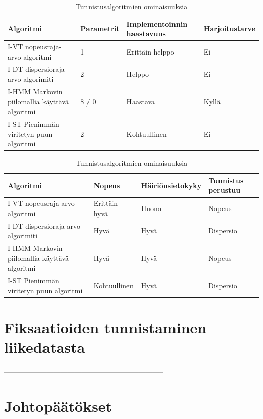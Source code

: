 		\begin{table}
    \begin{tabular}{| p{4cm} | p{3cm} | p{3cm}| p{3.5cm} |}
    \hline
    Algoritmi & Parametrit & Implementoinnin haastavuus & Harjoitustarve \\ \hline
    I-VT nopeusraja-arvo algoritmi & 1 & Erittäin helppo & Ei\\ \hline
    I-DT dispersioraja-arvo algorimiti & 2 & Helppo & Ei \\ \hline
    I-HMM Markovin piilomallia käyttävä algoritmi & 8 / 0 & Haastava & Kyllä \\ \hline
		I-ST Pienimmän viritetyn puun algoritmi & 2 & Kohtuullinen & Ei \\
    \hline
    \end{tabular}
		
		\vspace*{0.2 cm}
		
    \begin{tabular}{| p{4cm} | p{3cm} | p{3cm} |  p{3.5cm} |}
    \hline
    Algoritmi & Nopeus & Häiriönsietokyky & Tunnistus perustuu  \\ \hline
    I-VT nopeusraja-arvo algoritmi  & Erittäin hyvä & Huono  & Nopeus \\ \hline
    I-DT dispersioraja-arvo algorimiti  & Hyvä & Hyvä & Dispersio\\ \hline
    I-HMM Markovin piilomallia käyttävä algoritmi & Hyvä & Hyvä & Nopeus \\ \hline
		I-ST Pienimmän viritetyn puun algoritmi & Kohtuullinen & Hyvä & Dispersio \\
    \hline
    \end{tabular}
		
		\caption{Tunnistusalgoritmien ominaisuuksia}
		\label{table:alg_ominaisuudet}
		\end{table}
\newpage

\section{Fiksaatioiden tunnistaminen liikedatasta}

\label{sec:esimluku}

 --------------------------------------------------------------------

\section{Johtopäätökset}

